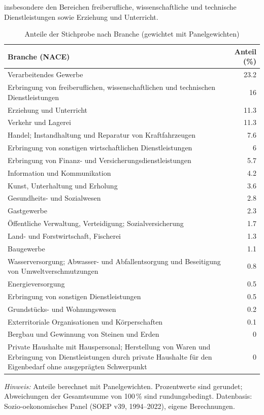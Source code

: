 insbesondere den Bereichen freiberufliche, wissenschaftliche und technische 
Dienstleistungen sowie Erziehung und Unterricht. 
\begin{table}[H]
\centering
\begin{threeparttable}
\caption{Anteile der Stichprobe nach Branche (gewichtet mit Panelgewichten)}
\label{tab:anhangC_branche}
\begin{tabularx}{\textwidth}{>{\raggedright\arraybackslash}X r}
\toprule
\textbf{Branche (NACE)} & \textbf{Anteil (\%)} \\
\midrule
Verarbeitendes Gewerbe & 23.2 \\
Erbringung von freiberuflichen, wissenschaftlichen und technischen Dienstleistungen & 16 \\
Erziehung und Unterricht & 11.3 \\
Verkehr und Lagerei & 11.3 \\
Handel; Instandhaltung und Reparatur von Kraftfahrzeugen & 7.6 \\
Erbringung von sonstigen wirtschaftlichen Dienstleistungen & 6 \\
Erbringung von Finanz- und Versicherungsdienstleistungen & 5.7 \\
Information und Kommunikation & 4.2 \\
Kunst, Unterhaltung und Erholung & 3.6 \\
Gesundheits- und Sozialwesen & 2.8 \\
Gastgewerbe & 2.3 \\
Öffentliche Verwaltung, Verteidigung; Sozialversicherung & 1.7 \\
Land- und Forstwirtschaft, Fischerei & 1.3 \\
Baugewerbe & 1.1 \\
Wasserversorgung; Abwasser- und Abfallentsorgung und Beseitigung von Umweltverschmutzungen & 0.8 \\
Energieversorgung & 0.5 \\
Erbringung von sonstigen Dienstleistungen & 0.5 \\
Grundstücks- und Wohnungswesen & 0.2 \\
Exterritoriale Organisationen und Körperschaften & 0.1 \\
Bergbau und Gewinnung von Steinen und Erden & 0 \\
Private Haushalte mit Hauspersonal; Herstellung von Waren und Erbringung von Dienstleistungen durch private Haushalte für den Eigenbedarf ohne ausgeprägten Schwerpunkt & 0 \\
\bottomrule
\end{tabularx}
\begin{tablenotes}
\footnotesize
\item \textit{Hinweis:} Anteile berechnet mit Panelgewichten. Prozentwerte sind gerundet; Abweichungen der Gesamtsumme von 100\,\% sind rundungsbedingt. Datenbasis: Sozio-oekonomisches Panel (SOEP v39, 1994--2022), eigene Berechnungen.
\end{tablenotes}
\end{threeparttable}
\end{table}